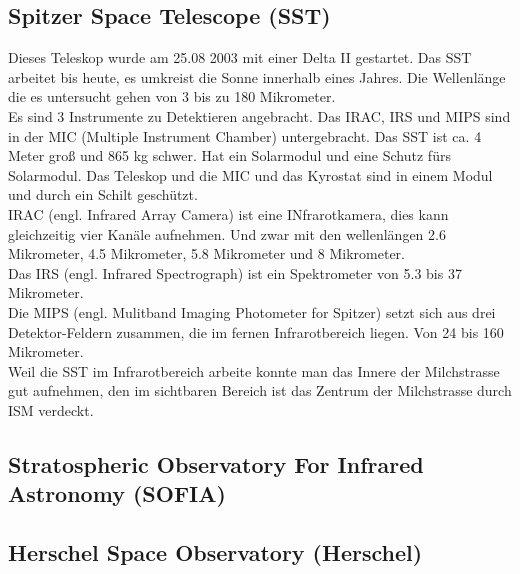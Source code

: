 \subsection{Spitzer Space Telescope (SST)}
Dieses Teleskop wurde am 25.08 2003 mit einer Delta II gestartet. Das SST arbeitet bis heute, es umkreist die Sonne innerhalb eines Jahres. Die Wellenlänge die es untersucht gehen von 3 bis zu 180 Mikrometer. \\
Es sind 3 Instrumente zu Detektieren angebracht. Das IRAC, IRS und MIPS sind in der MIC (Multiple Instrument Chamber) untergebracht. Das SST ist ca. 4 Meter groß und 865 kg schwer. Hat ein Solarmodul und eine Schutz fürs Solarmodul. Das Teleskop und die MIC und das Kyrostat sind in einem Modul und durch ein Schilt geschützt. \\
IRAC (engl. Infrared Array Camera) ist eine INfrarotkamera, dies kann gleichzeitig vier Kanäle aufnehmen. Und zwar mit den wellenlängen 2.6 Mikrometer, 4.5 Mikrometer, 5.8 Mikrometer und 8 Mikrometer.\\
Das IRS (engl. Infrared Spectrograph) ist ein Spektrometer von 5.3 bis 37 Mikrometer.\\
Die MIPS (engl. Mulitband Imaging Photometer for Spitzer) setzt sich aus drei Detektor-Feldern zusammen, die im fernen Infrarotbereich liegen. Von 24 bis 160 Mikrometer.\\
Weil die SST im Infrarotbereich arbeite konnte man das Innere der Milchstrasse gut aufnehmen, den im sichtbaren Bereich ist das Zentrum der Milchstrasse durch ISM verdeckt.
\subsection{Stratospheric Observatory For Infrared Astronomy (SOFIA)}
\subsection{Herschel Space Observatory (Herschel)}

